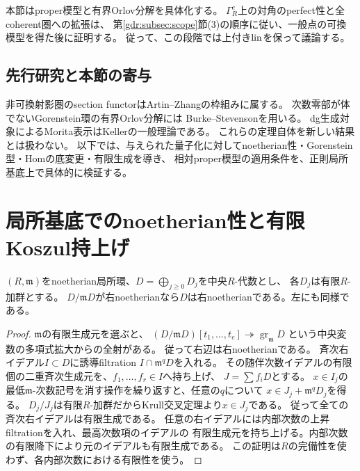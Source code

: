 \begin{remark}[主証明における局所模型の役割]\label{lp:rem:limits}
本節はproper模型と有界Orlov分解を具体化する。
$\Gamma_R^e$上の対角のperfect性と全coherent圏への拡張は、
第\ref{gdr:subsec:scope}節(3)の順序に従い、一般点の可換模型を得た後に証明する。
従って、この段階では上付き${\rm lin}$を保って議論する。
\end{remark}

\subsection{先行研究と本節の寄与}
非可換射影圏のsection functorはArtin--Zhangの枠組み\cite{LP-AZ}に属する。
次数零部が体でないGorenstein環の有界Orlov分解には
Burke--Stevenson\cite[Definition 5.1, Lemmas 6.1--6.2, Theorem 6.4]{LP-BS}を用いる。
dg生成対象によるMorita表示はKeller\cite[Theorem 3.8]{LP-Keller}の一般理論である。
これらの定理自体を新しい結果とは扱わない。
以下では、与えられた量子化に対してnoetherian性・Gorenstein型・Homの底変更・有限生成を導き、
相対proper模型の適用条件を、正則局所基底上で具体的に検証する。

\section{局所基底でのnoetherian性と有限Koszul持上げ}
\label{lp:sec:lift}
\begin{lemma}[次数別有限性を用いたnoetherian性]\label{lp:lem:noetherian}
$(R,\mathfrak m)$をnoetherian局所環、$D=\bigoplus_{j\ge0}D_j$を中央$R$-代数とし、
各$D_j$は有限$R$-加群とする。
$D/\mathfrak mD$が右noetherianなら$D$は右noetherianである。左にも同様である。
\end{lemma}
\begin{proof}
$\mathfrak m$の有限生成元を選ぶと、
$(D/\mathfrak mD)[t_1,\ldots,t_e]\twoheadrightarrow\operatorname{gr}_{\mathfrak m}D$
という中央変数の多項式拡大からの全射がある。
従って右辺は右noetherianである。
斉次右イデアル$I\subset D$に誘導filtration $I\cap\mathfrak m^qD$を入れる。
その随伴次数イデアルの有限個の二重斉次生成元を、$f_1,\ldots,f_r\in I$へ持ち上げ、
$J=\sum f_iD$とする。
$x\in I_j$の最低$\mathfrak m$-次数記号を消す操作を繰り返すと、任意の$q$について
$x\in J_j+\mathfrak m^qD_j$を得る。
$D_j/J_j$は有限$R$-加群だからKrull交叉定理より$x\in J_j$である。
従って全ての斉次右イデアルは有限生成である。
任意の右イデアルには内部次数の上昇filtrationを入れ、最高次数項のイデアルの
有限生成元を持ち上げる。内部次数の有限降下により元のイデアルも有限生成である。
この証明は$R$の完備性を使わず、各内部次数における有限性を使う。
\end{proof}


